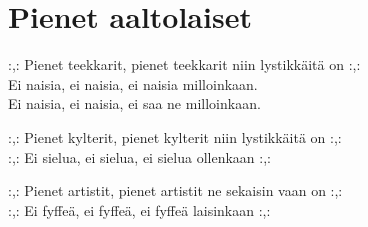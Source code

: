 \section{Pienet aaltolaiset}

:,: Pienet teekkarit, pienet teekkarit niin lystikkäitä on :,:\\
Ei naisia, ei naisia, ei naisia milloinkaan.\\
Ei naisia, ei naisia, ei saa ne milloinkaan.

:,: Pienet kylterit, pienet kylterit niin lystikkäitä on :,:\\
:,: Ei sielua, ei sielua, ei sielua ollenkaan :,:

:,: Pienet artistit, pienet artistit ne sekaisin vaan on :,:\\
:,: Ei fyffeä, ei fyffeä, ei fyffeä laisinkaan :,: